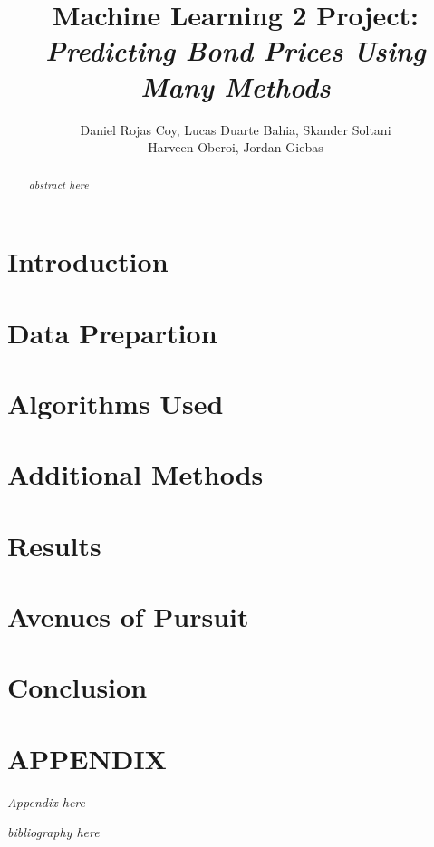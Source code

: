 \documentclass{article}
\author{Daniel Rojas Coy, Lucas Duarte Bahia, Skander Soltani\\ Harveen Oberoi, Jordan Giebas}
\begin{document}
\title{Machine Learning 2 Project:\\ \textit{Predicting Bond Prices Using Many Methods}}
\maketitle

\thispagestyle{empty}
\pagestyle{empty}


\begin{abstract}
\textit{abstract here}
\end{abstract}


\section{Introduction}


\section{Data Prepartion}

\section{Algorithms Used}

\section{Additional Methods}

\section{Results}

\section{Avenues of Pursuit}

\section{Conclusion}


\section{APPENDIX}
\textit{Appendix here}

\begin{thebibliography}{99}
\textit{bibliography here}
\end{thebibliography}
\end{document}
